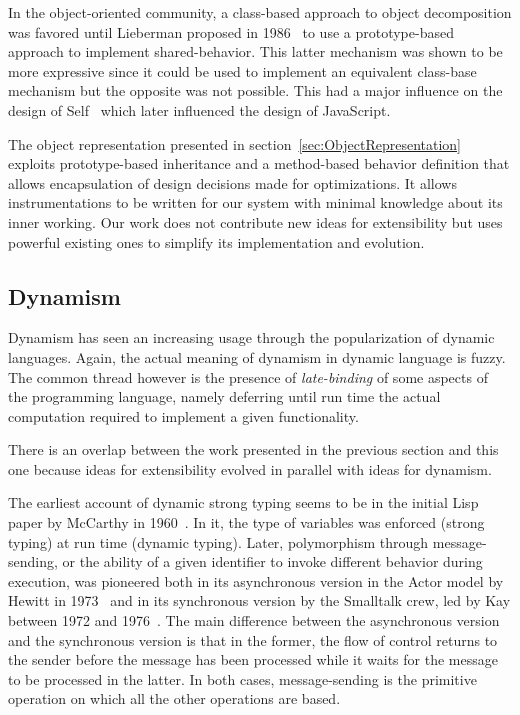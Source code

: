 In the object-oriented community, a class-based approach to object
decomposition was favored until Lieberman proposed in
1986~\cite{Lieberman:1986} to use a prototype-based approach to implement
shared-behavior. This latter mechanism was shown to be more expressive since it
could be used to implement an equivalent class-base mechanism but the opposite
was not possible. This had a major influence on the design of
Self~\cite{Ungar:1987} which later influenced the design of JavaScript.

The object representation presented in section~\ref{sec:ObjectRepresentation}
exploits prototype-based inheritance and a method-based behavior definition
that allows encapsulation of design decisions made for optimizations. It allows
instrumentations to be written for our system with minimal knowledge about its
inner working. Our work does not contribute new ideas for extensibility but
uses powerful existing ones to simplify its implementation and evolution.

\subsection{Dynamism}

Dynamism has seen an increasing usage through the popularization of dynamic
languages. Again, the actual meaning of dynamism in dynamic language is
fuzzy. The common thread however is the presence of \textit{late-binding} of
some aspects of the programming language, namely deferring until run time the
actual computation required to implement a given functionality.

There is an overlap between the work presented in the previous section and this
one because ideas for extensibility evolved in parallel with ideas for
dynamism.

The earliest account of dynamic strong typing seems to be in the initial Lisp
paper by McCarthy in 1960~\cite{McCarthy:1960}. In it, the type of variables
was enforced (strong typing) at run time (dynamic typing). Later, polymorphism
through message-sending, or the ability of a given identifier to invoke
different behavior during execution, was pioneered both in its asynchronous
version in the Actor model by Hewitt in 1973~\cite{Hewitt:1973} and in its
synchronous version by the Smalltalk crew, led by Kay between 1972 and
1976~\cite{Kay:1993}. The main difference between the asynchronous version and
the synchronous version is that in the former, the flow of control returns to
the sender before the message has been processed while it waits for the message
to be processed in the latter. In both cases, message-sending is the primitive
operation on which all the other operations are based.

